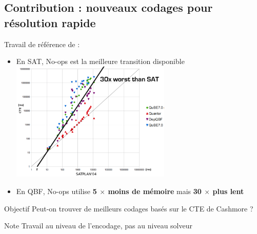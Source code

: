 \documentclass[english,french,usenames,dvipsnames]{beamer}
\begin{document}
\subsection{Contribution : nouveaux codages pour résolution rapide}

\begin{frame}{\subsecname}
Travail de référence de \cite{DBLP:conf/ecai/CashmoreFG12} :
\begin{itemize}
\item En SAT, No-ops est la meilleure transition disponible
\includegraphics[width=0.6\textwidth]{figures/coplas2018/cashmore.png}
\item En QBF, No-ops utilise \textbf{5 $ \times $ moins de mémoire} mais \textbf{30 $ \times $ plus lent}
\end{itemize}
\end{frame}





\begin{frame}{\subsecname}
\begin{exampleblock}{Objectif}
Peut-on trouver de meilleurs codages basés sur le CTE de Cashmore ?
\end{exampleblock}
\begin{alertblock}{Note}
Travail au niveau de l'encodage, {\color{red} pas au niveau solveur}
\end{alertblock}
\end{frame}
\end{document}
